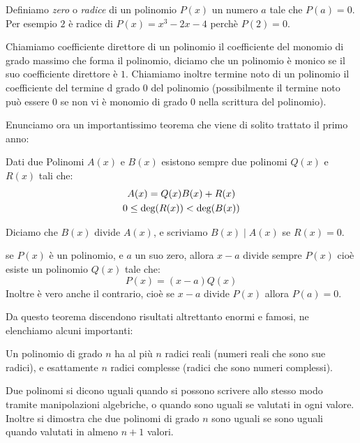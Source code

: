 \documentclass[11pt]{scrartcl}
\begin{document}
	\begin{definition}
		Definiamo \textit{zero} o \textit{radice} di un polinomio $P(x)$ un numero $a$ tale che $P(a)=0$. Per esempio $2$ è radice di $P(x)=x^3-2x-4$ perchè $P(2)=0$.
	\end{definition}
	\begin{definition}
		Chiamiamo coefficiente direttore di un polinomio il coefficiente del monomio di grado massimo che forma il polinomio, diciamo che un polinomio è monico se il suo coefficiente direttore è $1$. Chiamiamo inoltre termine noto di un polinomio il coefficiente del termine d grado $0$ del polinomio (possibilmente il termine noto può essere $0$ se non vi è monomio di grado $0$ nella scrittura del polinomio).
	\end{definition}
	Enunciamo ora un importantissimo teorema che viene di solito trattato il primo anno:
	\begin{theorem}
		Dati due Polinomi $A(x)$ e $B(x)$ esistono sempre due polinomi $Q(x)$ e $R(x)$ tali che:
		\begin{gather}
			\notag A(x)=Q(x)B(x)+R(x) \\
			\notag 0\le \text{deg}(R(x))<\text{deg}(B(x))
		\end{gather}
	\end{theorem}
	\begin{definition}
		Diciamo che $B(x)$ divide $A(x)$, e scriviamo $B(x) \mid A(x)$ se $R(x)=0$.
	\end{definition}
	\begin{theorem}[Ruffini]
		se $P(x)$ è un polinomio, e $a$ un suo zero, allora $x-a$ divide sempre $P(x)$ cioè esiste un polinomio $Q(x)$ tale che:
		$$P(x)=(x-a)Q(x)$$
		Inoltre è vero anche il contrario, cioè se $x-a$ divide $P(x)$ allora $P(a)=0$.
	\end{theorem}
	Da questo teorema discendono risultati altrettanto enormi e famosi, ne elenchiamo alcuni importanti:
	\begin{theorem}
		Un polinomio di grado $n$ ha al più $n$ radici reali (numeri reali che sono sue radici), e esattamente $n$ radici complesse (radici che sono numeri complessi).
	\end{theorem}
	\begin{theorem}
		Due polinomi si dicono uguali quando si possono scrivere allo stesso modo tramite manipolazioni algebriche, o quando sono uguali se valutati in ogni valore. Inoltre si dimostra che due polinomi di grado $n$ sono uguali se sono uguali quando valutati in almeno $n+1$ valori.
	\end{theorem}
\end{document}
